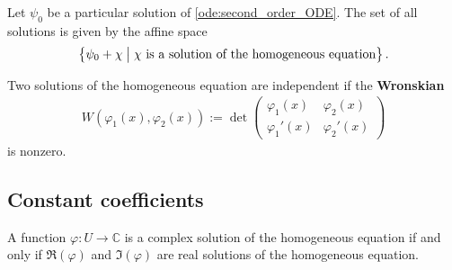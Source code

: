     \begin{property}
        Let $\psi_0$ be a particular solution of \cref{ode:second_order_ODE}. The set of all solutions is given by the affine space
        \begin{gather}
            \bigl\{\psi_0 + \chi\bigm\vert\chi\text{ is a solution of the homogeneous equation}\bigr\}\,.
        \end{gather}

    \end{property}

    \begin{property}[Wronskian]\label{ode:wronskian}
        Two solutions of the homogeneous equation are independent if the \textbf{Wronskian}
        \begin{gather}
            W\left(\varphi_1(x),\varphi_2(x)\right) := \det
            \begin{pmatrix}
                \varphi_1(x)&\varphi_2(x)\\
                \varphi_1'(x)&\varphi_2'(x)
            \end{pmatrix}
        \end{gather}
        is nonzero.
    \end{property}


\subsection{Constant coefficients}

    \begin{property}
        A function $\varphi:U\rightarrow\mathbb{C}$ is a complex solution of the homogeneous equation if and only if $\Re(\varphi)$ and $\Im(\varphi)$ are real solutions of the homogeneous equation.
    \end{property}

